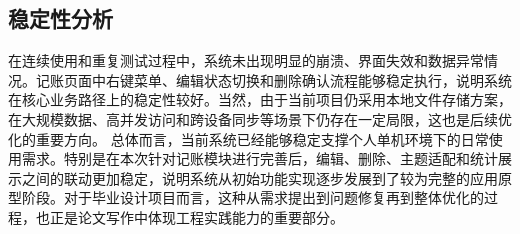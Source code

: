 \subsection{稳定性分析}
在连续使用和重复测试过程中，系统未出现明显的崩溃、界面失效和数据异常情况。记账页面中右键菜单、编辑状态切换和删除确认流程能够稳定执行，说明系统在核心业务路径上的稳定性较好。当然，由于当前项目仍采用本地文件存储方案，在大规模数据、高并发访问和跨设备同步等场景下仍存在一定局限，这也是后续优化的重要方向。
总体而言，当前系统已经能够稳定支撑个人单机环境下的日常使用需求。特别是在本次针对记账模块进行完善后，编辑、删除、主题适配和统计展示之间的联动更加稳定，说明系统从初始功能实现逐步发展到了较为完整的应用原型阶段。对于毕业设计项目而言，这种从需求提出到问题修复再到整体优化的过程，也正是论文写作中体现工程实践能力的重要部分。